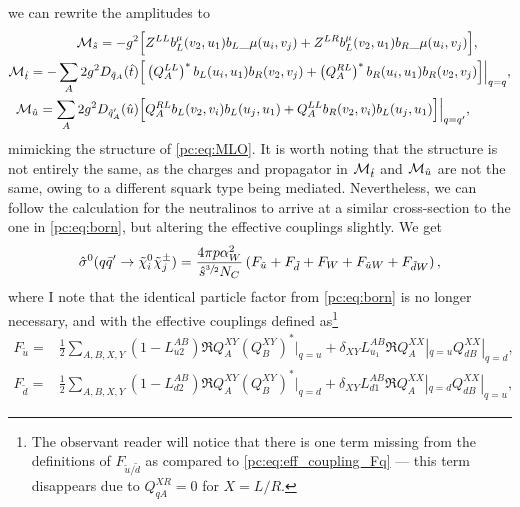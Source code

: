 \documentclass[../main.tex]{subfiles}
\begin{document}
we can rewrite the amplitudes to
\begin{subequations}
  \begin{align}
    \mathcal{M}_{\hat{s}} = -g^2 \Big[                                        &
      Z^{LL} b_L^\mu(v_2, u_1){b_L}\_{\mu}(u_i, v_j) + Z^{LR} b_L^\mu{(v_2, u_1)b_R}\_{\mu}(u_i, v_j)
    \Big],                                                             \\
    \mathcal{M}_{\hat{t}} = -\sum_A 2g^2 D_{\tilde{q}_A}(\hat{t}) \Big[       &
      \left(Q_{A}^{LL}\right)^\ast b_L(u_i, u_1) b_R(v_2, v_j) + \left(Q_{A}^{RL}\right)^\ast b_R(u_i, u_1) b_R(v_2, v_j)
    \Big] \Big|_{q=q},                                                 \\
    \mathcal{M}_{\hat{u}} = \sum_A 2g^2 D_{\tilde{q}^\prime_A}(\hat{u}) \Big[ &
      Q_{A}^{RL} b_L(v_2, v_i) b_L(u_j, u_1) + Q_{A}^{LL} b_R(v_2, v_i) b_L(u_j, u_1)
      \Big] \Big|_{q=q^\prime},
  \end{align}
\end{subequations}
mimicking the structure of \cref{pc:eq:MLO}.
It is worth noting that the structure is not entirely the same, as the charges and propagator in \(\mathcal{M}_{\hat{t}}\) and \(\mathcal{M}_{\hat{u}}\) are not the same, owing to a different squark type being mediated.
Nevertheless, we can follow the calculation for the neutralinos to arrive at a similar cross-section to the one in \cref{pc:eq:born}, but altering the effective couplings slightly.
We get
\begin{equation}
  \hat\sigma^0(q\bar{q}^\prime \to \tilde\chi^0_i \tilde\chi^\pm_j) = \frac{4 \pi p \alpha_W^2}{\hat{s}^{\sfrac{3}{2}} N_C} \left(F_{\tilde{u}} + F_{\tilde{d}} + F_W + F_{\tilde{u}W} + F_{\tilde{d}W}\right),
\end{equation}
where I note that the identical particle factor from \cref{pc:eq:born} is no longer necessary, and with the effective couplings defined as\footnote{The observant reader will notice that there is one term missing from the definitions of \(F_{\tilde{u}/\tilde{d}}\) as compared to \cref{pc:eq:eff_coupling_Fq} --- this term disappears due to \(Q_{qA}^{XR} = 0\) for \(X = L/R\).}
\\
\begin{subequations}
  \begin{align}
    F_{\tilde{u}} = & \frac{1}{2} \sum_{A,B,X,Y} (1 - L_{u2}^{AB}) \Re{Q_{A}^{XY} (Q_{B}^{XY})^\ast}\Big|_{q=u} + \delta_{XY} L_{u_1}^{AB} \Re{Q_{A}^{XX}|_{q=u} Q_{dB}^{XX}|_{q=d}}, \\
    F_{\tilde{d}} = & \frac{1}{2} \sum_{A,B,X,Y} (1 - L_{d2}^{AB}) \Re{Q_{A}^{XY} (Q_{B}^{XY})^\ast}\Big|_{q=d} + \delta_{XY} L_{d1}^{AB} \Re{Q_{A}^{XX}|_{q=d} Q_{dB}^{XX}|_{q=u}},
  \end{align}
\end{subequations}
\end{document}
